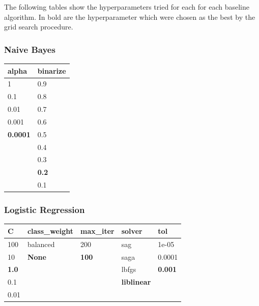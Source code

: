 \documentclass[epsfig,a4paper,11pt,titlepage,twoside,openany]{book}
\begin{document}
The following tables show the hyperparameters tried for each for each baseline algorithm. In bold are the hyperparameter which were chosen as the best by the grid search procedure. 

\subsubsection{Naive Bayes}

\begin{table}[H]
\centering
\begin{tabular}{l|l}
alpha           & binarize     \\ \hline
1               & 0.9          \\
0.1             & 0.8          \\
0.01            & 0.7          \\
0.001           & 0.6          \\
\textbf{0.0001} & 0.5          \\
                & 0.4          \\
                & 0.3          \\
                & \textbf{0.2} \\
                & 0.1     
\end{tabular}
\end{table}


\subsubsection{Logistic Regression}

\begin{table}[H]
\centering
\begin{tabular}{l|l|l|l|l}
C            & class\_weight & max\_iter    & solver             & tol            \\ \hline
100          & balanced      & 200          & sag                & 1e-05          \\
10           & \textbf{None} & \textbf{100} & saga               & 0.0001         \\
\textbf{1.0} &               &              & lbfgs              & \textbf{0.001} \\
0.1          &               &              & \textbf{liblinear} &                \\
0.01         &               &              &                    & 
\end{tabular}
\end{table}
\end{document}
